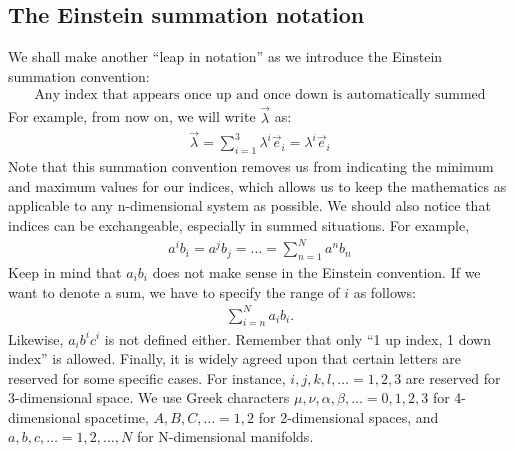 \documentclass{book}
\theoremstyle{definition}
\begin{document}
\subsection{The Einstein summation notation}
We shall make another ``leap in notation'' as we introduce the Einstein summation convention:
\begin{align*}
\boxed{\text{Any index that appears once up and once down is automatically summed}}
\end{align*}
For example, from now on, we will write $\vec{\lambda}$ as:
\begin{align*}
{\vec{\lambda}} = \sum_{i=1}^{3}\lambda^i\vec{e}_i = {\lambda^i\vec{e}_i}
\end{align*}
Note that this summation convention removes us from indicating the minimum and maximum values for our indices, which allows us to keep the mathematics as applicable to any n-dimensional system as possible. We should also notice that indices can be exchangeable, especially in summed situations. For example, 
\begin{align*}
\boxed{a^ib_i = a^jb_j = \dots = \sum_{n=1}^{N}a^nb_n}
\end{align*}
Keep in mind that $a_ib_i$ does not make sense in the Einstein convention. If we want to denote a sum, we have to specify the range of $i$ as follows:
\begin{align*}
\sum_{i=n}^{N}a_ib_i.
\end{align*} 
Likewise, $a_ib^ic^i$ is not defined either. Remember that only ``1 up index, 1 down index'' is allowed. Finally, it is widely agreed upon that certain letters are reserved for some specific cases. For instance, $i,j,k,l,\dots = 1,2,3$ are reserved for 3-dimensional space. We use Greek characters $\mu, \nu, \alpha, \beta,\dots = 0,1,2,3$ for 4-dimensional spacetime, $A,B,C,\dots = 1,2$ for 2-dimensional spaces, and $a,b,c,\dots = 1,2,\dots,N$ for N-dimensional manifolds. 
\end{document}

